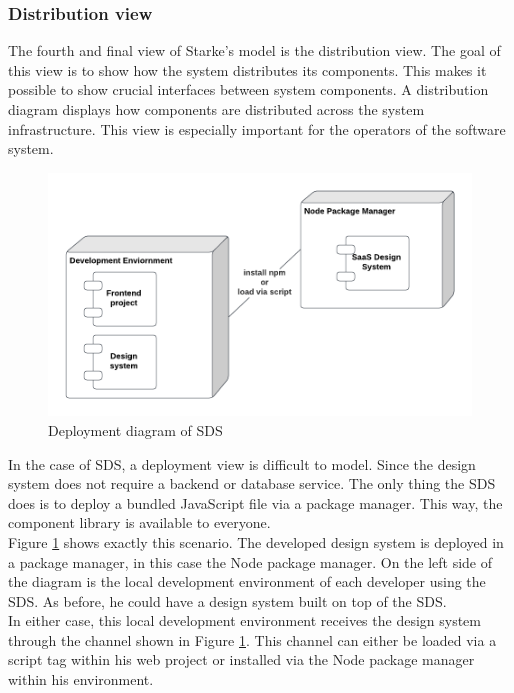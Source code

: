 \subsubsection{Distribution view}
The fourth and final view of Starke's model is the distribution view. The goal of this view is to show how the system distributes its components. This makes it possible to show crucial interfaces between system components. A distribution diagram displays how components are distributed across the system infrastructure. This view is especially important for the operators of the software system. \cite{starke_effektive_2020} \\
\begin{figure}[htbp]
    \centerline{
    \includegraphics[width=\linewidth]{images/deployment_diagram_sds.png}}
\caption{Deployment diagram of \ac{SDS}}
\label{deployment_diagram_sds}
\end{figure}
In the case of SDS, a deployment view is difficult to model. Since the design system does not require a backend or database service. The only thing the SDS does is to deploy a bundled JavaScript file via a package manager. This way, the component library is available to everyone. \\
Figure \ref{deployment_diagram_sds} shows exactly this scenario. The developed design system is deployed in a package manager, in this case the Node package manager. On the left side of the diagram is the local development environment of each developer using the \ac{SDS}. As before, he could have a design system built on top of the \ac{SDS}. \\
In either case, this local development environment receives the design system through the channel shown in Figure \ref{deployment_diagram_sds}. This channel can either be loaded via a script tag within his web project or installed via the Node package manager within his environment.  
